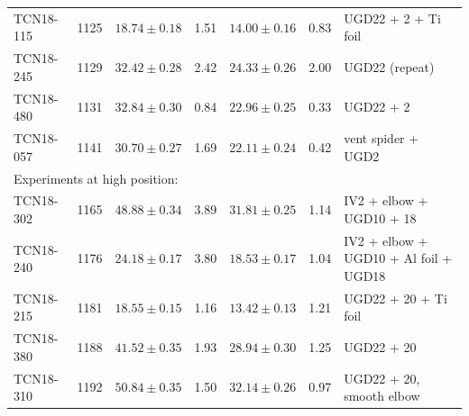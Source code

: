 \documentclass[10pt,letterpaper]{article}
\begin{document}
\begin{table}
{\begin{tabular}{l r r r r r p{}}
TCN18-115 & 1125 & $18.74 \pm 0.18$ & 1.51 & $14.00 \pm 0.16$ & 0.83 & UGD22 + 2 + Ti foil \\
TCN18-245 & 1129 & $32.42 \pm 0.28$ & 2.42 & $24.33 \pm 0.26$ & 2.00 & UGD22 (repeat) \\
TCN18-480 & 1131 & $32.84 \pm 0.30$ & 0.84 & $22.96 \pm 0.25$ & 0.33 & UGD22 + 2 \\
TCN18-057 & 1141 & $30.70 \pm 0.27$ & 1.69 & $22.11 \pm 0.24$ & 0.42 & vent spider + UGD2 \\
\midrule
\multicolumn{5}{l}{Experiments at high position:} \\
TCN18-302 & 1165 & $48.88 \pm 0.34$ & 3.89 & $31.81 \pm 0.25$ & 1.14 & IV2 + elbow + UGD10 + 18 \\
TCN18-240 & 1176 & $24.18 \pm 0.17$ & 3.80 & $18.53 \pm 0.17$ & 1.04 & IV2 + elbow + UGD10 + Al foil + UGD18 \\
TCN18-215 & 1181 & $18.55 \pm 0.15$ & 1.16 & $13.42 \pm 0.13$ & 1.21 & UGD22 + 20 + Ti foil \\
TCN18-380 & 1188 & $41.52 \pm 0.35$ & 1.93 & $28.94 \pm 0.30$ & 1.25 & UGD22 + 20 \\
TCN18-310 & 1192 & $50.84 \pm 0.35$ & 1.50 & $32.14 \pm 0.26$ & 0.97 & UGD22 + 20, smooth elbow \\
\bottomrule
\end{tabular}
}
\label{tab:transmission}
\end{table}
\end{document}
